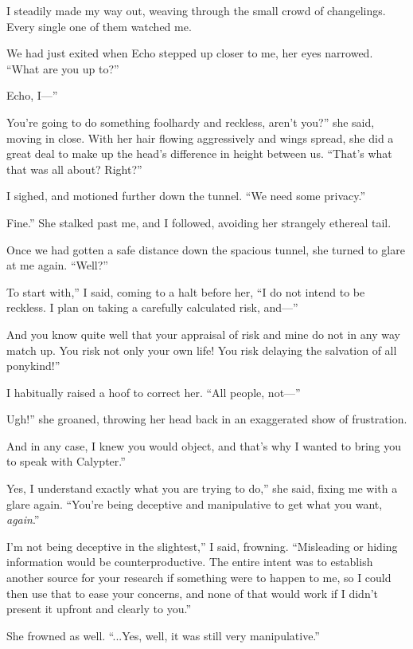 I steadily made my way out, weaving through the small crowd of changelings. Every single one of them watched me.

We had just exited when Echo stepped up closer to me, her eyes narrowed. “What are you up to?”

\leavevmode{}Echo, I—”

\leavevmode{}You’re going to do something foolhardy and reckless, aren’t you?” she said, moving in close. With her hair flowing aggressively and wings spread, she did a great deal to make up the head’s difference in height between us. “That’s what that was all about? Right?”

I sighed, and motioned further down the tunnel. “We need some privacy.”

\leavevmode{}Fine.” She stalked past me, and I followed, avoiding her strangely ethereal tail.

Once we had gotten a safe distance down the spacious tunnel, she turned to glare at me again. “Well?”

\leavevmode{}To start with,” I said, coming to a halt before her, “I do not intend to be reckless. I plan on taking a carefully calculated risk, and—”

\leavevmode{}And you know quite well that your appraisal of risk and mine do not in any way match up. You risk not only your own life! You risk delaying the salvation of all ponykind!”

I habitually raised a hoof to correct her. “All people, not—”

\leavevmode{}Ugh!” she groaned, throwing her head back in an exaggerated show of frustration.

\leavevmode{}And in any case, I knew you would object, and that’s why I wanted to bring you to speak with Calypter.”

\leavevmode{}Yes, I understand exactly what you are trying to do,” she said, fixing me with a glare again. “You’re being deceptive and manipulative to get what you want, \textit{again}.”

\leavevmode{}I’m not being deceptive in the slightest,” I said, frowning. “Misleading or hiding information would be counterproductive. The entire intent was to establish another source for your research if something were to happen to me, so I could then use that to ease your concerns, and none of that would work if I didn’t present it upfront and clearly to you.”

She frowned as well. “...Yes, well, it was still very manipulative.”

